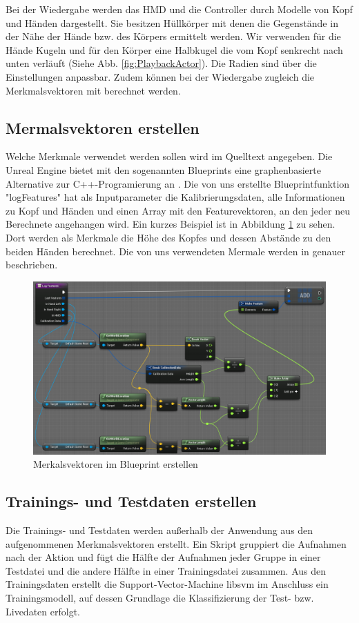 Bei der Wiedergabe werden das HMD und die Controller durch Modelle von Kopf und Händen dargestellt. Sie besitzen Hüllkörper mit denen die Gegenstände in der Nähe der Hände bzw. des Körpers ermittelt werden. Wir verwenden für die Hände Kugeln und für den Körper eine Halbkugel die vom Kopf senkrecht nach unten verläuft (Siehe Abb. \ref{fig:PlaybackActor}). Die Radien sind über die Einstellungen anpassbar. Zudem können bei der Wiedergabe zugleich die Merkmalsvektoren mit berechnet werden.

\subsection{Mermalsvektoren erstellen}
Welche Merkmale verwendet werden sollen wird im Quelltext angegeben. Die Unreal Engine bietet mit den sogenannten Blueprints eine graphenbasierte Alternative zur C++-Programierung an \cite{Blueprints}. Die von uns erstellte Blueprintfunktion "logFeatures" hat als Inputparameter die Kalibrierungsdaten, alle Informationen zu Kopf und Händen und einen Array mit den Featurevektoren, an den jeder neu Berechnete angehangen wird. Ein kurzes Beispiel ist in Abbildung \ref{fig:LogFeatures} zu sehen. Dort werden als Merkmale die Höhe des Kopfes und dessen Abstände zu den beiden Händen berechnet. Die von uns verwendeten Mermale werden in \cite{Features} genauer beschrieben. 
\begin{figure}[hbtp]
\includegraphics[width=1\linewidth]{LogFeatures2.png}
\caption{Merkalsvektoren im Blueprint erstellen}
\label{fig:LogFeatures}
\end{figure}

\subsection{Trainings- und Testdaten erstellen}
Die Trainings- und Testdaten werden außerhalb der Anwendung aus den aufgenommenen Merkmalsvektoren erstellt. Ein Skript gruppiert die Aufnahmen nach der Aktion und fügt die Hälfte der Aufnahmen jeder Gruppe in einer Testdatei und die andere Hälfte in einer Trainingsdatei zusammen. Aus den Trainingsdaten erstellt die Support-Vector-Machine libsvm \cite{libsvm} im Anschluss ein Trainingsmodell, auf dessen Grundlage die Klassifizierung der Test- bzw. Livedaten erfolgt.

